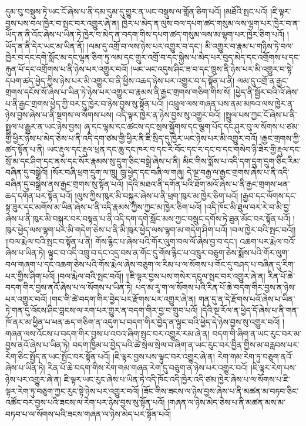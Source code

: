 དུམ་བུ་བསྡུས་ཏེ་ཡང་ངོ་ཞེས་པ་ནི་དམ་དུམ་དུ་གྱུར་ན་ཡང་བསྡུས་ལ་གློན་ཅིག་པའོ། །མཐོའི་སྤང་པའོ། །ཇི་ལྟར་བྱས་པས་བལ་ཁྱེར་བ་སྤང་བར་འགྱུར་ཞེ་ན། ཁྱེར་པ་མེད་ན་ལུས་བལ་དཔག་ཚད་གསུམ་ལས་ལྷག་པར་ཁྱེར་བ་ན་ཡོད་ན་ནི་འོང་ཞེས་པ་ཡིན་ཏེ་ཁྱེར་བ་མེད་ན་བདག་གིས་དཔག་ཚད་གསུམ་ལས་མ་ལྷག་པར་ཁྱེར་ཅིག་པའོ། །ཡོད་ན་ནི་དེར་ཡང་མ་ཡིན་ནོ། །ལམ་དུ་འགྲོ་བ་ལས་ཉེས་པར་འགྱུར་བ་དང་། མི་འགྱུར་བ་རྣམ་པ་གཉིས་ཏེ་བལ་ཁྱེར་བ་དང་དགེ་སློང་མ་དང་ལྷན་ཅིག་ཏུ་ལམ་དང་གྲུར་འགྲོ་བ་དང་སྐྱེས་པ་མེད་པར་བུད་མེད་དང་འགྲོགས་པ་དང་རྐུན་པོ་དང་འགྲོགས་པ་ནི་ཉེས་པར་འགྱུར་བའོ། །ཡང་ཡང་འདུས་ཤིང་ཟ་བ་དང་ཁྲུས་ནི་ཉེས་པར་མི་འགྱུར་བ་སྟེ་དཔག་ཚད་ཕྱེད་ཀྱིས་ཉེས་པར་མི་འགྱུར་བ་ནི་ཕྱིས་འཆད་ཉེས་པར་འགྱུར་བ་ད་སྟོན་པ་ནི། ལམ་དུ་འགྲོ་ན་རྒྱང་གྲགས་དངོས་སོ་ཞེས་པ་ཡིན་ཏེ་ཉེས་པར་འགྱུར་བ་རྣམས་ནི་རྒྱང་གྲགས་གཅིག་གིས་སོ། །ཕྱེད་ནི་སྦྱོར་བའི་འོ་ཞེས་པ་ནི་རྒྱང་གྲགས་ཕྱེད་ཀྱི་བར་དུ་ཁྱེར་བ་ཉེས་བྱས་སུ་སྟོན་པའོ། །འཕྲུལ་ལས་གཞན་པས་ནམ་མཁའ་ལས་ཁྱེར་ན་ཉེས་བྱས་ཞེས་པ་ནི་སྔགས་ལ་སོགས་པས། འདི་ལྟར་ཁྱེར་ན་ཉེས་བྱས་སུ་འགྱུར་བའོ། །སྤྲུལ་པས་ཀྱང་ངོ་ཞེས་པ་ནི་སྤྲུལ་པ་རྒྱུར་ན་ཡང་ཉེས་བྱས། ཞྭ་དང་ལྷམ་དང་ཚངས་དང་སྲས་སྐྱོགས་དང་ལྕག་པོད་དང་ཤུར་བུ་ལ་སོགས་པ་ཙམ་གྱི་ཕྱིར་ཉེས་པ་མེད་ཅེས་པ་ནི་འདི་དག་ཙམ་གྱི་ཕྱིར་ནི་ཇི་སྲིད་དུ་ཁྱེར་ཡང་ཉེས་པར་མི་འགྱུར་བའོ། །རྒྱང་གྲགས་ཀྱི་ཚད་སྟོན་པ་ནི། ཡང་རྡུལ་དང་རྡུལ་ཕྲན་དང་ཆུ་དང་ཁར་བ་དང་རི་བོང་དང་ར་དང་བ་དང་གསེབ་ཉི་ཟེར་གྱི་རྡུལ་དང་སྲོ་མ་དང་ཤིག་དང་ནས་དང་སོར་རྣམས་སུ་དྲུག་ཅིང་བསྒྲེ་ཞེས་པ་ནི། མིང་གིས་སྨོས་པ་འདི་དག་དྲུག་དྲུག་ཅིང་རིམ་བཞིན་དུ་བསྒྲེའོ། །སོར་བཞི་ཕྲག་དྲུག་ལ་ཁྲུ། ཁྲུ་ཕྱེད་དང་བཞི་ལ་གཞུ། དེ་ལྔ་བརྒྱ་ལ་རྒྱང་གྲགས་ཞེས་པ་ནི་འདི་བཞིན་དུ་བསྒྲེས་ནས་རྒྱང་གྲགས་སུ་སྟོན་པའོ། །དེའི་མཐའ་ནི་དགོན་པའི་ཐོག་མའོ་ཞེས་པ་ནི་རྒྱང་གྲགས་ཕན་ཆད་དགོན་པར་སྟོན་པའོ། །ལུས་ཀྱིས་ཁུར་མི་བསྐུར་ཞེས་པ་ནི་ཕྲག་ཁུར་མ་ཁྱེར་ཅིག་པའོ། །རྒྱབ་དང་ལོགས་དང་སྟ་ཟུར་དང་མགོས་མ་ཡིན་ཞེས་པ་ནི་འདི་རྣམས་ཀྱིས་ཀྱང་མ་ཁྱེར་ཅིག་པའོ། །འདི་ཁོང་མི་ཐུལ་བར་རེ་བ་མི་བྱ་ཞེས་པ་ནི་ཁུར་མི་བསྐུར་བར་བསྟན་པ་ནི་འདི་དག་དགེ་སློང་མས་ཀྱང་བསྲུང་དགོས་ཏེ་ཐུན་མོང་བར་སྟོན་པའོ། །ཁུར་ཕྱེད་ལས་ལྷག་པར་མི་གདེག་ཅེས་པ་ནི་མི་ཁུར་ཕྱེད་ལས་ལྷག་མ་གདེག་ཤིག་པའོ། །བལ་ཁྱེར་བའི་སྤང་བའོ།། །།བལ་རྨེལ་བའི་སྤང་བ་སྟོན་པ་ནི། གོས་རྙིང་པ་ཞེས་པའི་གོར་ལུག་བལ་ལོ་ཞེས་བྱ་བ་དང་། འཆག་པར་རྨེལ་བའོ་ཞེས་པ་ཡིན་ཏེ། ལྟུང་བ་འདི་འཁྲུ་བ་དང་འདྲ་བས་ན་གོང་དུ་གོས་རྙིང་པ་འཁྲུར་བཅུག་ཅེས་སྨོས་པའི་གོར་ལུག་བལ་གཞག་པ་དང་འཆག་ཅེས་པའི་གོས་རྨེལ་ཞེས་བཅུག་ལ་རིམ་པ་ལ་སོགས་པ་གོང་དུ་བཤད་པ་བཞིན་དུ་རིག་པར་གྱིས་ཤིག་པའོ། །བལ་རྨེལ་བའི་སྤང་བའོ།། །།ཇི་ལྟར་བྱས་པས་གསེར་དངུལ་སྤང་བར་འགྱུར་ཞེ་ན། རིན་པོ་ཆེ་བདག་གིར་བྱས་ནའོ་ཞེས་པ་ལ་སོགས་པ་ཡིན་ཏེ། པད་མ་རཱ་ག་ལ་སོགས་པའི་རིན་པོ་ཆེ་བདག་གིར་བྱས་ན་ཉེས་པར་འགྱུར་བའོ། །གང་གི་ཚེ་བདག་གིར་བྱེད་པར་རྫོགས་པར་འགྱུར་ཞེ་ན། གན་དུ་ན་དེ་རྫོགས་པའོ་ཞེས་པ་ཡིན་ཏེ་གན་དུ་འོངས་ཤིང་བླངས་ལ་རག་པར་གྱུར་ན་བདག་གིར་བྱ་བ་གྲུབ་པའོ། །དེའི་སྔ་རོལ་ན་ཕྱེད་དོ་ཞེས་པ་ནི་གན་ཁོ་ནར་མ་ཕྱིན་པ་ཕན་ཆད་གཅིག་ན་འདུག་པ་བདག་གིར་བྱེད་ན་ལྟུང་བའི་ཕྱེད་དེ་ཉེས་བྱས་སུ་འགྱུར་བའོ། །གཞན་ལས་འོངས་པ་བདག་གིར་བྱས་པ་འབའ་ཞིག་སྤང་བར་འགྱུར་རམ་ཞེ་ན། བདག་གི་ཞིག་ན་ཡང་རུང་བར་མ་བྱས་ནའོ་ཞེས་པ་ཡིན་ཏེ། བདག་ཁྱིམ་པ་བྱེད་པའི་ཚེ་སྲེལ་སྲེལ་བ་ཞིག་ན་ཡང་རུང་བར་བྱིན་གྱིས་མ་བརླབས་པར་རེག་ཅིང་སྤྱོད་ན་ཡང་སྤོང་བར་སྟོན་པའོ། །ཇི་ལྟར་བྱས་པས་ལྟུང་བར་འགྱུར་ཞེ་ན། རེག་གམ་རེག་ཏུ་བཅུག་ནའོ་ཞེས་པ་ཡིན་ཏེ། རིན་པོ་ཆེ་བདག་གིས་རེག་གམ་གཞན་རེག་དུ་བཅུག་ན་ཉེས་པར་འགྱུར་བའོ། །ཇི་ལྟར་རེག་པས་ཉེས་པར་འགྱུར་ཞེ་ན། ཇི་ལྟར་ཡང་རུང་ཞེས་པ་ཡིན་ཏེ་འདི་ཁོང་འདི་ཁྱེར་འདི་ཙམ་ཁྱེར་ཞེས་པ་ལ་སོགས་པ་ཇི་ལྟར་རེག་ཏུ་བཅུག་ཀྱང་རུང་སྟེ་ཉེས་པར་འགྱུར་བའོ། །ཟོང་གིས་ཟངས་ལ་ཉེས་བྱས་ཞེས་པ་ནི་མཚན་མ་བཏབ་ཅིང་འཚོང་བར་བྱས་པའི་ཟངས་ལ་རེག་པར་ཉེས་བྱས་སུ་སྟོན་པའོ། །གཞན་ལ་ཉེས་མེད་ཅེས་པ་ནི་མཚན་མས་མ་བཏབ་པ་ལ་སོགས་པའི་ཟངས་གཞན་ལ་ཉེས་མེད་པར་སྟོན་པའོ། 